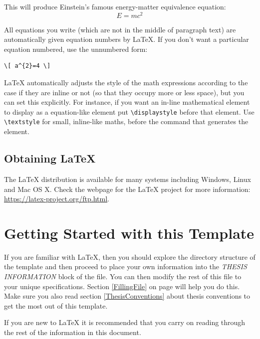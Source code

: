 This will produce Einstein's famous energy-matter equivalence equation:
\begin{equation}
E = mc^{2}
\label{eqn:Einstein}
\end{equation}

All equations you write (which are not in the middle of paragraph text) are automatically given equation numbers by \LaTeX{}. If you don't want a particular equation numbered, use the unnumbered form:
\begin{verbatim}
\[ a^{2}=4 \]
\end{verbatim}

\LaTeX{} automatically adjusts the style of the math expressions according to the case if they are inline or not (so that they occupy more or less space), but you can set this explicitly. For instance, if you want an in-line mathematical element to display as a equation-like element put \verb|\displaystyle| before that element. Use \verb|\textstyle| for small, inline-like maths, before the command that generates the element.

\subsection{Obtaining \LaTeX{}}
 
The \LaTeX{} distribution is available for many systems including Windows, Linux and Mac OS X. Check the webpage for the \LaTeX{} project for more information: \url{https://latex-project.org/ftp.html}.


\section{Getting Started with this Template}

If you are familiar with \LaTeX{}, then you should explore the directory structure of the template and then proceed to place your own information into the \emph{THESIS INFORMATION} block of the  file. You can then modify the rest of this file to your unique specifications. Section \ref{FillingFile} on page \pageref{FillingFile} will help you do this. Make sure you also read section \ref{ThesisConventions} about thesis conventions to get the most out of this template.

If you are new to \LaTeX{} it is recommended that you carry on reading through the rest of the information in this document.

